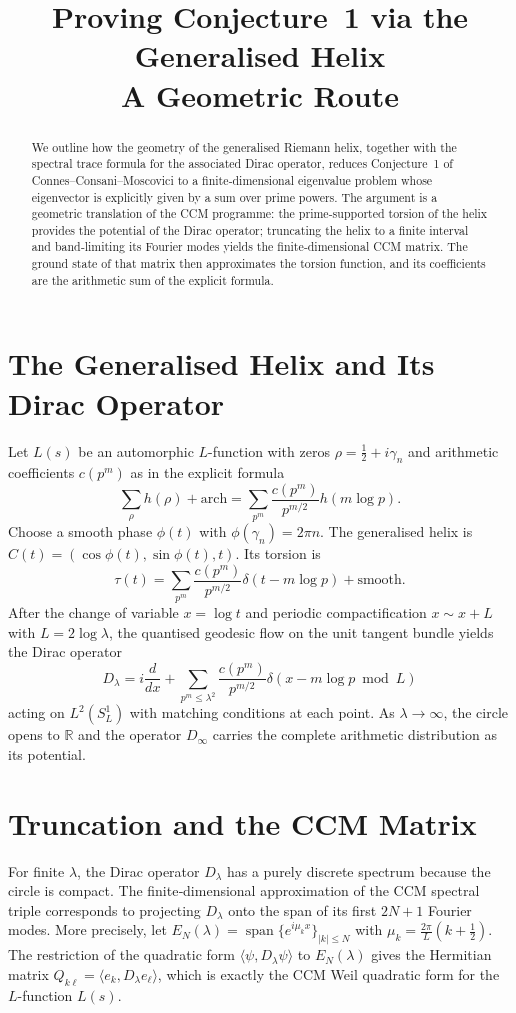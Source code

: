 \documentclass[12pt,a4paper]{article}
\title{\bf Proving Conjecture~1 via the Generalised Helix\\
\large A Geometric Route}
\author{}
\date{}
\begin{document}
\maketitle

\begin{abstract}
We outline how the geometry of the generalised Riemann helix, together with the spectral trace formula for the associated Dirac operator, reduces Conjecture~1 of Connes--Consani--Moscovici to a finite‑dimensional eigenvalue problem whose eigenvector is explicitly given by a sum over prime powers.  The argument is a geometric translation of the CCM programme: the prime‑supported torsion of the helix provides the potential of the Dirac operator; truncating the helix to a finite interval and band‑limiting its Fourier modes yields the finite‑dimensional CCM matrix.  The ground state of that matrix then approximates the torsion function, and its coefficients are the arithmetic sum of the explicit formula.
\end{abstract}

\section{The Generalised Helix and Its Dirac Operator}
Let \(L(s)\) be an automorphic \(L\)-function with zeros \(\rho=\frac12+i\gamma_n\) and arithmetic coefficients \(c(p^m)\) as in the explicit formula
\[
\sum_{\rho} h(\rho) + \text{arch} = \sum_{p^m} \frac{c(p^m)}{p^{m/2}} h(m\log p).
\]
Choose a smooth phase \(\phi(t)\) with \(\phi(\gamma_n)=2\pi n\). The generalised helix is \(C(t)=(\cos\phi(t),\sin\phi(t),t)\). Its torsion is
\[
\tau(t) = \sum_{p^m} \frac{c(p^m)}{p^{m/2}} \delta(t-m\log p) + \text{smooth}.
\]
After the change of variable \(x=\log t\) and periodic compactification \(x\sim x+L\) with \(L=2\log\lambda\), the quantised geodesic flow on the unit tangent bundle yields the Dirac operator
\[
D_\lambda = i\frac{d}{dx} + \sum_{p^m\le\lambda^2} \frac{c(p^m)}{p^{m/2}} \delta(x-m\log p \bmod L)
\]
acting on \(L^2(S^1_L)\) with matching conditions at each point. As \(\lambda\to\infty\), the circle opens to \(\mathbb{R}\) and the operator \(D_\infty\) carries the complete arithmetic distribution as its potential.

\section{Truncation and the CCM Matrix}
For finite \(\lambda\), the Dirac operator \(D_\lambda\) has a purely discrete spectrum because the circle is compact. The finite‑dimensional approximation of the CCM spectral triple corresponds to projecting \(D_\lambda\) onto the span of its first \(2N+1\) Fourier modes. More precisely, let \(E_N(\lambda)=\operatorname{span}\{e^{i\mu_k x}\}_{|k|\le N}\) with \(\mu_k=\frac{2\pi}{L}(k+\frac12)\). The restriction of the quadratic form \(\langle\psi,D_\lambda\psi\rangle\) to \(E_N(\lambda)\) gives the Hermitian matrix \(Q_{k\ell} = \langle e_k, D_\lambda e_\ell\rangle\), which is exactly the CCM Weil quadratic form for the \(L\)-function \(L(s)\).
\end{document}
